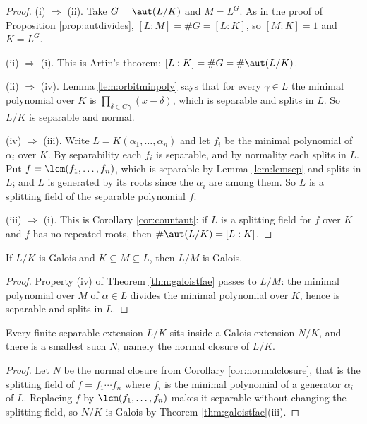 \begin{proof}
	(i) $\Rightarrow$ (ii). Take $G = \aut(L/K)$ and $M = L^G$. As in the proof of Proposition \ref{prop:autdivides}, $[L:M] = \#G = [L:K]$, so $[M:K] = 1$ and $K = L^G$.

	(ii) $\Rightarrow$ (i). This is Artin's theorem: $[L:K] = \#G = \#\aut(L/K)$.

	(ii) $\Rightarrow$ (iv). Lemma \ref{lem:orbitminpoly} says that for every $\gamma \in L$ the minimal polynomial over $K$ is $\prod_{\delta \in G\gamma}(x - \delta)$, which is separable and splits in $L$. So $L/K$ is separable and normal.

	(iv) $\Rightarrow$ (iii). Write $L = K(\alpha_1,\dots,\alpha_n)$ and let $f_i$ be the minimal polynomial of $\alpha_i$ over $K$. By separability each $f_i$ is separable, and by normality each splits in $L$. Put $f = \lcm(f_1,\dots,f_n)$, which is separable by Lemma \ref{lem:lcmsep} and splits in $L$; and $L$ is generated by its roots since the $\alpha_i$ are among them. So $L$ is a splitting field of the separable polynomial $f$.

	(iii) $\Rightarrow$ (i). This is Corollary \ref{cor:countaut}: if $L$ is a splitting field for $f$ over $K$ and $f$ has no repeated roots, then $\#\aut(L/K) = [L:K]$.
\end{proof}

\begin{corollary}\label{cor:galoisintermediate}
	If $L/K$ is Galois and $K \subseteq M \subseteq L$, then $L/M$ is Galois.
\end{corollary}

\begin{proof}
	Property (iv) of Theorem \ref{thm:galoistfae} passes to $L/M$: the minimal polynomial over $M$ of $\alpha \in L$ divides the minimal polynomial over $K$, hence is separable and splits in $L$.
\end{proof}

\begin{corollary}\label{cor:galoisclosure}
	Every finite separable extension $L/K$ sits inside a Galois extension $N/K$, and there is a smallest such $N$, namely the normal closure of $L/K$.
\end{corollary}

\begin{proof}
	Let $N$ be the normal closure from Corollary \ref{cor:normalclosure}, that is the splitting field of $f = f_1\cdots f_n$ where $f_i$ is the minimal polynomial of a generator $\alpha_i$ of $L$. Replacing $f$ by $\lcm(f_1,\dots,f_n)$ makes it separable without changing the splitting field, so $N/K$ is Galois by Theorem \ref{thm:galoistfae}(iii).
\end{proof}

